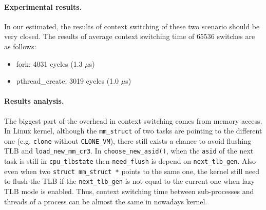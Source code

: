 \paragraph{Experimental results.}
In our estimated, the results of context switching of these two scenario should be very closed. The results of average context switching time of $65536$ switches are as follows:
\begin{itemize}[leftmargin=*]
	\item fork: 4031 cycles (1.3 $\mu$s)
	\item pthread\_create: 3019 cycles (1.0 $\mu$s)
\end{itemize}

\paragraph{Results analysis.} The biggest part of the overhead in context switching comes from memory access. In Linux kernel, although the \texttt{mm\_struct} of two tasks are pointing to the different one (e.g. \texttt{clone} without \texttt{CLONE\_VM}), there still exists a chance to avoid flushing TLB and \texttt{load\_new\_mm\_cr3}. In \texttt{choose\_new\_asid()}, when the \texttt{asid} of the next task is still in \texttt{cpu\_tlbstate} then \texttt{need\_flush} is depend on \texttt{next\_tlb\_gen}. Also even when two \texttt{struct mm\_struct *} points to the same one, the kernel still need to flush the TLB if the \texttt{next\_tlb\_gen} is not equal to the current one when lazy TLB mode is enabled. Thus, context switching time between sub-processes and threads of a process can be almost the same in nowadays kernel.
